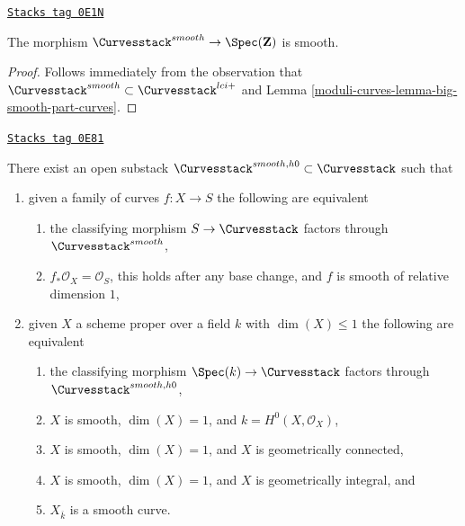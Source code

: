 \begin{lemma}
\label{moduli-curves-lemma-smooth-curves-smooth}
\href{https://stacks.math.columbia.edu/tag/0E1N}{\texttt{Stacks tag 0E1N}}

The morphism $\Curvesstack^{smooth} \to \Spec(\mathbf{Z})$ is smooth.
\end{lemma}

\begin{proof}
Follows immediately from the observation that
$\Curvesstack^{smooth} \subset \Curvesstack^{lci+}$
and Lemma \ref{moduli-curves-lemma-big-smooth-part-curves}.
\end{proof}

\begin{lemma}
\label{moduli-curves-lemma-smooth-curves-h0}
\href{https://stacks.math.columbia.edu/tag/0E81}{\texttt{Stacks tag 0E81}}

There exist an open substack
$\Curvesstack^{smooth, h0} \subset \Curvesstack$
such that
\begin{enumerate}
\item given a family of curves $f : X \to S$ the following are equivalent
\begin{enumerate}
\item the classifying morphism $S \to \Curvesstack$ factors
through $\Curvesstack^{smooth}$,
\item $f_*\mathcal{O}_X = \mathcal{O}_S$, this holds after any base change,
and $f$ is smooth of relative dimension $1$,
\end{enumerate}
\item given $X$ a scheme proper over a field $k$ with
$\dim(X) \leq 1$ the following are equivalent
\begin{enumerate}
\item the classifying morphism $\Spec(k) \to \Curvesstack$
factors through $\Curvesstack^{smooth, h0}$,
\item $X$ is smooth, $\dim(X) = 1$, and $k = H^0(X, \mathcal{O}_X)$,
\item $X$ is smooth, $\dim(X) = 1$, and $X$ is geometrically connected,
\item $X$ is smooth, $\dim(X) = 1$, and $X$ is geometrically integral, and
\item $X_{\overline{k}}$ is a smooth curve.
\end{enumerate}
\end{enumerate}
\end{lemma}

